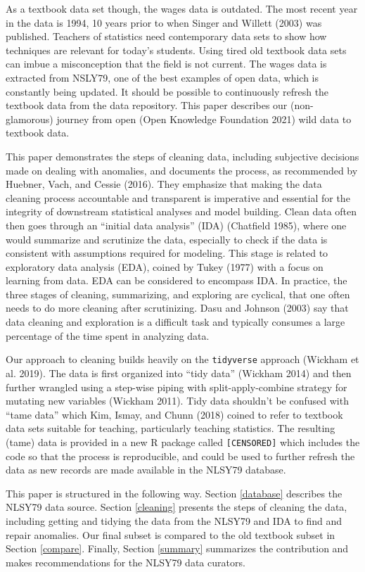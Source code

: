 \documentclass{article}
\begin{document}
As a textbook data set though, the wages data is outdated. The most recent year in the data is 1994, 10 years prior to when Singer and Willett (2003) was published. Teachers of statistics need contemporary data sets to show how techniques are relevant for today's students. Using tired old textbook data sets can imbue a misconception that the field is not current. The wages data is extracted from NSLY79, one of the best examples of open data, which is constantly being updated. It should be possible to continuously refresh the textbook data from the data repository. This paper describes our (non-glamorous) journey from open (Open Knowledge Foundation 2021) wild data to textbook data.

This paper demonstrates the steps of cleaning data, including subjective decisions made on dealing with anomalies, and documents the process, as recommended by Huebner, Vach, and Cessie (2016). They emphasize that making the data cleaning process accountable and transparent is imperative and essential for the integrity of downstream statistical analyses and model building. Clean data often then goes through an ``initial data analysis'' (IDA) (Chatfield 1985), where one would summarize and scrutinize the data, especially to check if the data is consistent with assumptions required for modeling. This stage is related to exploratory data analysis (EDA), coined by Tukey (1977) with a focus on learning from data. EDA can be considered to encompass IDA. In practice, the three stages of cleaning, summarizing, and exploring are cyclical, that one often needs to do more cleaning after scrutinizing. Dasu and Johnson (2003) say that data cleaning and exploration is a difficult task and typically consumes a large percentage of the time spent in analyzing data.

Our approach to cleaning builds heavily on the \texttt{tidyverse} approach (Wickham et al. 2019). The data is first organized into ``tidy data'' (Wickham 2014) and then further wrangled using a step-wise piping with split-apply-combine strategy for mutating new variables (Wickham 2011). Tidy data shouldn't be confused with ``tame data'' which Kim, Ismay, and Chunn (2018) coined to refer to textbook data sets suitable for teaching, particularly teaching statistics. The resulting (tame) data is provided in a new R package called \texttt{[CENSORED]} which includes the code so that the process is reproducible, and could be used to further refresh the data as new records are made available in the NLSY79 database.

This paper is structured in the following way. Section \ref{database} describes the NLSY79 data source. Section \ref{cleaning} presents the steps of cleaning the data, including getting and tidying the data from the NLSY79 and IDA to find and repair anomalies. Our final subset is compared to the old textbook subset in Section \ref{compare}. Finally, Section \ref{summary} summarizes the contribution and makes recommendations for the NLSY79 data curators.
\end{document}
